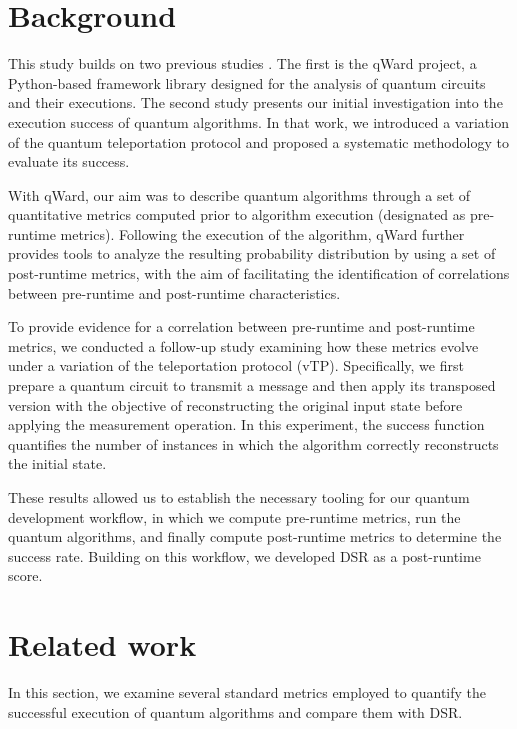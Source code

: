 \documentclass[10pt,conference]{IEEEtran}
\begin{document}
\section{Background}
\label{sec:background}

This study builds on two previous studies \cite{qward2026, vTPMarquez_2026}. The first is the qWard project, a Python-based framework library designed for the analysis of quantum circuits and their executions. The second study presents our initial investigation into the execution success of quantum algorithms. In that work, we introduced a variation of the quantum teleportation protocol and proposed a systematic methodology to evaluate its success.

With qWard, our aim was to describe quantum algorithms through a set of quantitative metrics computed prior to algorithm execution (designated as pre-runtime metrics). Following the execution of the algorithm, qWard further provides tools to analyze the resulting probability distribution by using a set of post-runtime metrics, with the aim of facilitating the identification of correlations between pre-runtime and post-runtime characteristics.

To provide evidence for a correlation between pre-runtime and post-runtime metrics, we conducted a follow-up study examining how these metrics evolve under a variation of the teleportation protocol (vTP). Specifically, we first prepare a quantum circuit to transmit a message and then apply its transposed version with the objective of reconstructing the original input state before applying the measurement operation. In this experiment, the success function quantifies the number of instances in which the algorithm correctly reconstructs the initial state.

These results allowed us to establish the necessary tooling for our quantum development workflow, in which we compute pre-runtime metrics, run the quantum algorithms, and finally compute post-runtime metrics to determine the success rate. Building on this workflow, we developed DSR as a post-runtime score.

\section{Related work}
\label{sec:related-work}

In this section, we examine several standard metrics employed to quantify the successful execution of quantum algorithms and compare them with DSR.
\end{document}
